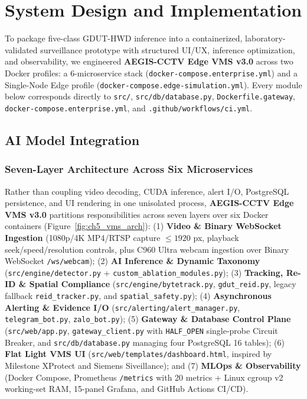 \chapter{System Design and Implementation}
\label{chap:system}

To package five-class GDUT-HWD inference into a containerized, laboratory-validated surveillance prototype with structured UI/UX, inference optimization, and observability, we engineered \textbf{AEGIS-CCTV Edge VMS v3.0} across two Docker profiles: a 6-microservice stack (\nolinkurl{docker-compose.enterprise.yml}) and a Single-Node Edge profile (\nolinkurl{docker-compose.edge-simulation.yml}). Every module below corresponds directly to \texttt{src/}, \nolinkurl{src/db/database.py}, \nolinkurl{Dockerfile.gateway}, \nolinkurl{docker-compose.enterprise.yml}, and \nolinkurl{.github/workflows/ci.yml}.

\section{AI Model Integration}

\subsection{Seven-Layer Architecture Across Six Microservices}

Rather than coupling video decoding, CUDA inference, alert I/O, PostgreSQL persistence, and UI rendering in one unisolated process, \textbf{AEGIS-CCTV Edge VMS v3.0} partitions responsibilities across seven layers over six Docker containers (Figure~\ref{fig:ch5_vms_arch}): (1) \textbf{Video \& Binary WebSocket Ingestion} (1080p/4K MP4/RTSP capture $\le 1920$ px, playback seek/speed/resolution controls, plus C960 Ultra webcam ingestion over Binary WebSocket \texttt{/ws/webcam}); (2) \textbf{AI Inference \& Dynamic Taxonomy} (\nolinkurl{src/engine/detector.py} + \nolinkurl{custom_ablation_modules.py}); (3) \textbf{Tracking, Re-ID \& Spatial Compliance} (\nolinkurl{src/engine/bytetrack.py}, \nolinkurl{gdut_reid.py}, legacy fallback \texttt{reid\_tracker.py}, and \nolinkurl{spatial_safety.py}); (4) \textbf{Asynchronous Alerting \& Evidence I/O} (\nolinkurl{src/alerting/alert_manager.py}, \texttt{telegram\_bot.py}, \texttt{zalo\_bot.py}); (5) \textbf{Gateway \& Database Control Plane} (\nolinkurl{src/web/app.py}, \nolinkurl{gateway_client.py} with \texttt{HALF\_OPEN} single-probe Circuit Breaker, and \nolinkurl{src/db/database.py} managing four PostgreSQL 16 tables); (6) \textbf{Flat Light VMS UI} (\nolinkurl{src/web/templates/dashboard.html}, inspired by Milestone XProtect and Siemens Siveillance); and (7) \textbf{MLOps \& Observability} (Docker Compose, Prometheus \texttt{/metrics} with 20 metrics + Linux cgroup v2 working-set RAM, 15-panel Grafana, and GitHub Actions CI/CD).

